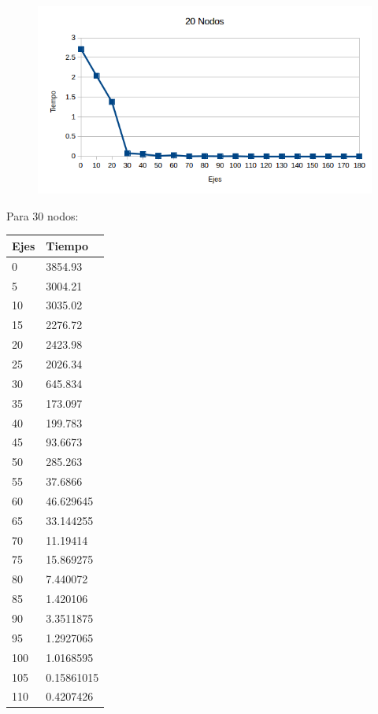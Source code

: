   \begin{figure}[h!]
   \begin{center}
 	\includegraphics[scale=0.7]{imagenes/exacto/20Nodos.png}
   \end{center}
 \end{figure}
 
 Para 30 nodos: \\
\begin{tabular}{| l | l |}
  \hline
  Ejes & Tiempo \\ \hline
  0 & 3854.93 \\ \hline
  5 & 3004.21 \\ \hline
  10 & 3035.02 \\ \hline
  15 & 2276.72 \\ \hline
  20 & 2423.98 \\ \hline
  25 & 2026.34 \\ \hline
  30 & 645.834 \\ \hline
  35 & 173.097 \\ \hline
  40 & 199.783 \\ \hline
  45 & 93.6673 \\ \hline
  50 & 285.263 \\ \hline
  55 & 37.6866 \\ \hline
  60 & 46.629645 \\ \hline
  65 & 33.144255 \\ \hline
  70 & 11.19414 \\ \hline
  75 & 15.869275 \\ \hline
  80 & 7.440072 \\ \hline
  85 & 1.420106 \\ \hline
  90 & 3.3511875 \\ \hline
  95 & 1.2927065 \\ \hline
  100 & 1.0168595 \\ \hline
  105 & 0.15861015 \\ \hline
  110 & 0.4207426 \\ \hline
\end{tabular}



